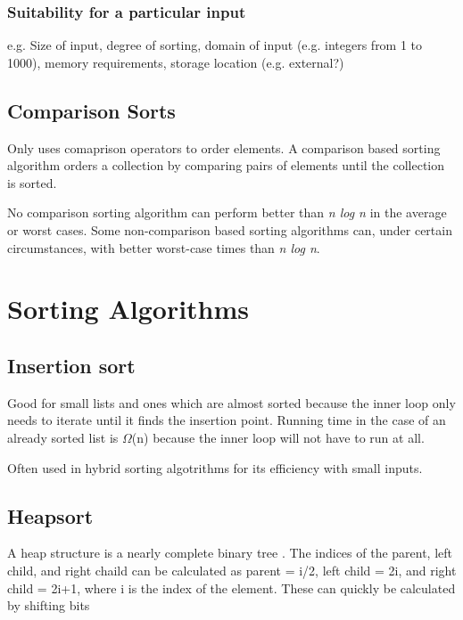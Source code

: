 \documentclass[12pt, a4paper]{article}
\begin{document}
\subsubsection{Suitability for a particular input}

e.g. Size of input, degree of sorting, domain of input (e.g. integers from 1 to 1000), memory requirements, storage location (e.g. external?)

\subsection{Comparison Sorts}

Only uses comaprison operators to order elements. A comparison based sorting algorithm orders a collection by comparing pairs of elements until the collection is sorted.

No comparison sorting algorithm can perform better than \emph{n log n} in the average or worst cases. Some non-comparison based sorting algorithms can, under certain circumstances, with better worst-case times than \emph{n log n}.

\section{Sorting Algorithms}


\subsection{Insertion sort}

Good for small lists and ones which are almost sorted because the inner loop only needs to iterate until it finds the insertion point. Running time in the case of an already sorted list is $\Omega$(n) because the inner loop will not have to run at all.

Often used in hybrid sorting algotrithms for its efficiency with small inputs.

\subsection{Heapsort}

A heap structure is a nearly complete binary tree \autocite[p. 128]{cormen01}. The indices of the parent, left child, and right chaild can be calculated as parent = i/2, left child = 2i, and right child = 2i+1, where i is the index of the element. These can quickly be calculated by shifting bits \autocite[p. 128]{cormen01}
\end{document}
